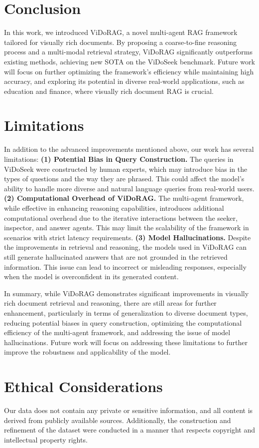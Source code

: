 \section{Conclusion}
In this work, we introduced ViDoRAG, a novel multi-agent RAG framework tailored for visually rich documents. By proposing a coarse-to-fine reasoning process and a multi-modal retrieval strategy, ViDoRAG significantly outperforms existing methods, achieving new SOTA on the ViDoSeek benchmark. Future work will focus on further optimizing the framework's efficiency while maintaining high accuracy, and exploring its potential in diverse real-world applications, such as education and finance, where visually rich document RAG is crucial.

\section*{Limitations}
In addition to the advanced improvements mentioned above, our work has several limitations:  
\textbf{(1) Potential Bias in Query Construction.} The queries in ViDoSeek were constructed by human experts, which may introduce bias in the types of questions and the way they are phrased. This could affect the model's ability to handle more diverse and natural language queries from real-world users.
\textbf{(2) Computational Overhead of ViDoRAG.} The multi-agent framework, while effective in enhancing reasoning capabilities, introduces additional computational overhead due to the iterative interactions between the seeker, inspector, and answer agents. This may limit the scalability of the framework in scenarios with strict latency requirements.
\textbf{(3) Model Hallucinations.} Despite the improvements in retrieval and reasoning, the models used in ViDoRAG can still generate hallucinated answers that are not grounded in the retrieved information. This issue can lead to incorrect or misleading responses, especially when the model is overconfident in its generated content.

In summary, while ViDoRAG demonstrates significant improvements in visually rich document retrieval and reasoning, there are still areas for further enhancement, particularly in terms of generalization to diverse document types, reducing potential biases in query construction, optimizing the computational efficiency of the multi-agent framework, and addressing the issue of model hallucinations. Future work will focus on addressing these limitations to further improve the robustness and applicability of the model.

\section*{Ethical Considerations}

Our data does not contain any private or sensitive information, and all content is derived from publicly available sources. Additionally, the construction and refinement of the dataset were conducted in a manner that respects copyright and intellectual property rights.


